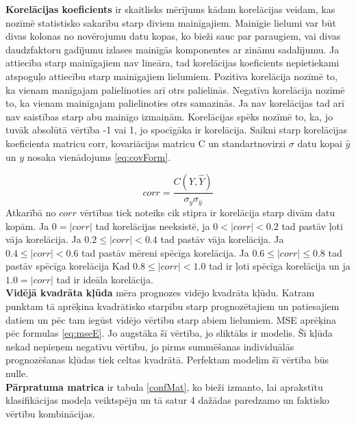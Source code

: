\documentclass[12pt,paper=A4]{report}
\begin{document}
\textbf{Korelācijas koeficients} ir skaitlisks mērījums kādam korelācijas veidam, kas nozīmē statistisko sakarību starp diviem mainīgajiem. Mainīgie lielumi var būt divas kolonas no novērojumu datu kopas, ko bieži sauc par paraugiem, vai divas daudzfaktoru gadījumu izlases mainīgās komponentes ar zināmu sadalījumu. Ja attiecība starp mainīgajiem nav lineāra, tad korelācijas koeficients nepietiekami atspoguļo attiecību starp mainīgajiem lielumiem.
Pozitīva korelācija nozīmē to, ka vienam manīgajam palielinoties arī otrs palielinās. Negatīva korelācija nozīmē to, ka vienam mainīgajam palielinoties otrs samazinās. Ja nav korelācijas tad arī nav saistības starp abu mainīgo izmaiņām. Korelācijas spēks nozīmē to, ka, jo tuvāk absolūtā vērtība -1 vai 1, jo spocīgāka ir korelācija.
Saikni starp korelācijas koeficienta matricu corr, kovariācijas matricu C un standartnovirzi $\sigma$ datu kopai $\hat{y}$ un $y$ nosaka vienādojums \ref{eq:covForm}.

\begin{equation}
corr = {\frac {C(Y, \hat{Y})}{\sigma_y \sigma_{\hat{y}} }} 
\label{eq:covForm}
\end{equation}
Atkarībā no $corr$ vērtības tiek noteiks cik stipra ir korelācija starp divām  datu kopām. Ja $0 = |corr|$ tad korelācijas neeksistē, ja $0<|corr|<0.2$ tad pastāv ļoti vāja korelācija. Ja $0.2 \leq |corr| <0.4$ tad pastāv vāja korelācija. Ja $0.4 \leq |corr|<0.6$ tad pastāv mēreni spēcīga korelācija.
Ja $0.6 \leq |corr| \leq 0.8$ tad pastāv spēcīga korelācija
Kad $0.8 \leq |corr| <1.0$ tad ir ļoti spēcīga korelācija un ja  $1.0 = |corr|$ tad ir ideāla korelācija. \\



\textbf{Vidējā kvadrāta kļūda} mēra prognozes vidējo kvadrāta kļūdu. Katram punktam tā aprēķina kvadrātisko starpību starp prognozētajiem un patiesajiem datiem un pēc tam iegūst vidējo vērtību starp abiem lielumiem. MSE aprēķina pēc formulas \ref{eq:mseE}. Jo augstāka šī vērtība, jo sliktāks ir modelis. Šī kļūda nekad nepieņem negatīvu vērtību, jo pirms summēšanas individuālās prognozēšanas kļūdas tiek celtas kvadrātā. Perfektam modelim šī vērtība būs nulle. \\


\textbf{Pārpratuma matrica} ir tabula \ref{confMat}, ko bieži izmanto, lai aprakstītu klasifikācijas modeļa veiktspēju un tā satur 4 dažādas paredzamo un faktisko vērtību kombinācijas.
\end{document}
